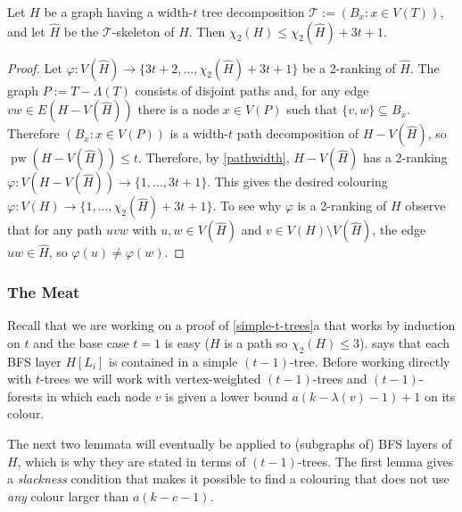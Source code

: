\documentclass[kpfonts]{patmorin}
\DeclareMathOperator{\pw}{pw}
\newcommand{\trn}{\chi_2}
\theoremstyle{named}
\newcommand{\weirdref}[2]{\cref{#1}#2}
\begin{document}

\begin{lem}\label{skeleton-colour}
    Let $H$ be a graph having a width-$t$ tree decomposition $\mathcal{T}:=(B_x:x\in V(T))$, and let $\hat{H}$ be the $\mathcal{T}$-skeleton of $H$.  Then $\trn(H)\le \trn(\hat{H}) + 3t+1$.
\end{lem}

\begin{proof}
    Let $\varphi:V(\hat{H})\to \{3t+2,\ldots,\trn(\hat{H})+3t+1\}$ be a 2-ranking of $\hat{H}$. The graph $P:=T-\Lambda(T)$ consists of disjoint paths and, for any edge $vw\in E(H-V(\hat{H}))$ there is a node $x\in V(P)$ such that $\{v,w\}\subseteq B_x$.  Therefore $(B_x:x\in V(P))$ is a width-$t$ path decomposition of $H-V(\hat{H})$, so $\pw(H-V(\hat{H}))\le t$.  Therefore, by \cref{pathwidth}, $H-V(\hat{H})$ has a 2-ranking $\varphi:V(H-V(\hat{H}))\to\{1,\ldots,3t+1\}$.  This gives the desired colouring $\varphi: V(H)\to\{1,\ldots,\trn(\hat{H})+3t+1\}$.  To see why $\varphi$ is a 2-ranking of $H$ observe that for any path $uvw$ with $u,w\in V(\hat{H})$ and $v\in V(H)\setminus V(\hat{H})$, the edge $uw\in\hat{H}$, so $\varphi(u)\neq\varphi(w)$.
\end{proof}

\subsubsection{The Meat}

Recall that we are working on a proof of \weirdref{simple-t-trees}{a} that works by induction on $t$ and the base case $t=1$ is easy ($H$ is a path so $\trn(H)\le 3$).  says that each BFS layer $H[L_i]$ is contained in a simple $(t-1)$-tree.  Before working directly with $t$-trees we will work with vertex-weighted $(t-1)$-trees and $(t-1)$-forests in which each node $v$ is given a lower bound $a(k-\lambda(v)-1)+1$ on its colour.

The next two lemmata will eventually be applied to (subgraphs of) BFS layers of $H$, which is why they are stated in terms of $(t-1)$-trees.  The first lemma gives a \emph{slackness} condition that makes it possible to find a colouring that does not use \emph{any} colour larger than $a(k-c-1)$.
\end{document}

